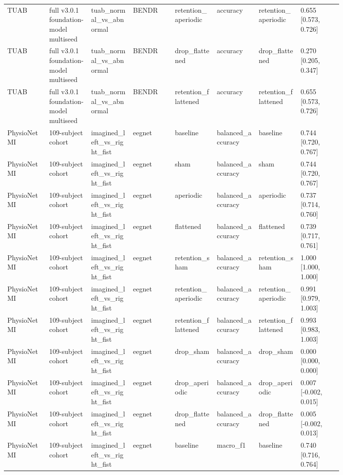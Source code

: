 \begin{longtable}{p{0.10\linewidth}p{0.10\linewidth}p{0.10\linewidth}p{0.10\linewidth}p{0.10\linewidth}p{0.10\linewidth}p{0.10\linewidth}p{0.10\linewidth}}
TUAB & full v3.0.1 foundation-model multiseed & tuab\_normal\_vs\_abnormal & BENDR & retention\_aperiodic & accuracy & retention\_aperiodic & 0.655 [0.573, 0.726]\\
TUAB & full v3.0.1 foundation-model multiseed & tuab\_normal\_vs\_abnormal & BENDR & drop\_flattened & accuracy & drop\_flattened & 0.270 [0.205, 0.347]\\
TUAB & full v3.0.1 foundation-model multiseed & tuab\_normal\_vs\_abnormal & BENDR & retention\_flattened & accuracy & retention\_flattened & 0.655 [0.573, 0.726]\\
PhysioNet MI & 109-subject cohort & imagined\_left\_vs\_right\_fist & eegnet & baseline & balanced\_accuracy & baseline & 0.744 [0.720, 0.767]\\
PhysioNet MI & 109-subject cohort & imagined\_left\_vs\_right\_fist & eegnet & sham & balanced\_accuracy & sham & 0.744 [0.720, 0.767]\\
PhysioNet MI & 109-subject cohort & imagined\_left\_vs\_right\_fist & eegnet & aperiodic & balanced\_accuracy & aperiodic & 0.737 [0.714, 0.760]\\
PhysioNet MI & 109-subject cohort & imagined\_left\_vs\_right\_fist & eegnet & flattened & balanced\_accuracy & flattened & 0.739 [0.717, 0.761]\\
PhysioNet MI & 109-subject cohort & imagined\_left\_vs\_right\_fist & eegnet & retention\_sham & balanced\_accuracy & retention\_sham & 1.000 [1.000, 1.000]\\
PhysioNet MI & 109-subject cohort & imagined\_left\_vs\_right\_fist & eegnet & retention\_aperiodic & balanced\_accuracy & retention\_aperiodic & 0.991 [0.979, 1.003]\\
PhysioNet MI & 109-subject cohort & imagined\_left\_vs\_right\_fist & eegnet & retention\_flattened & balanced\_accuracy & retention\_flattened & 0.993 [0.983, 1.003]\\
PhysioNet MI & 109-subject cohort & imagined\_left\_vs\_right\_fist & eegnet & drop\_sham & balanced\_accuracy & drop\_sham & 0.000 [0.000, 0.000]\\
PhysioNet MI & 109-subject cohort & imagined\_left\_vs\_right\_fist & eegnet & drop\_aperiodic & balanced\_accuracy & drop\_aperiodic & 0.007 [-0.002, 0.015]\\
PhysioNet MI & 109-subject cohort & imagined\_left\_vs\_right\_fist & eegnet & drop\_flattened & balanced\_accuracy & drop\_flattened & 0.005 [-0.002, 0.013]\\
PhysioNet MI & 109-subject cohort & imagined\_left\_vs\_right\_fist & eegnet & baseline & macro\_f1 & baseline & 0.740 [0.716, 0.764]\\

\end{longtable}

